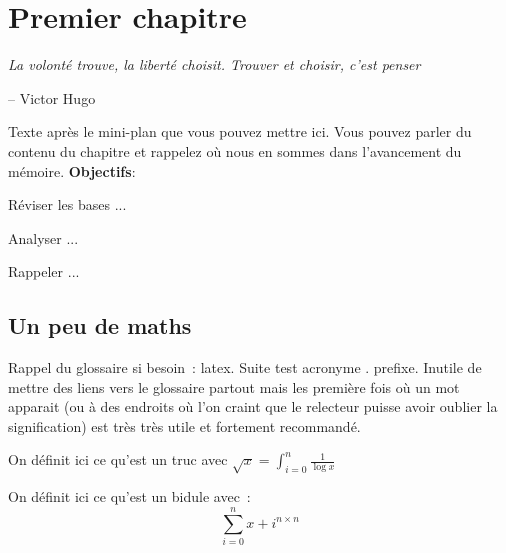 \chapter{Premier chapitre}
\label{chap:one}

\epigraph{\itshape  La volonté trouve, la liberté choisit. Trouver et choisir, c'est penser}{-- Victor Hugo}

\startcontents[chapters]

\printMyMinitoc

Texte après le mini-plan que vous pouvez mettre ici. Vous pouvez parler du contenu du chapitre et rappelez où nous en sommes dans l'avancement du mémoire.\newline
{\noindent \color{colorEPISEN-MEMOIRE}\textbf{Objectifs}}:
\begin{itemizeEPISEN}
	\item Réviser les bases ...
	\item Analyser ... 
	\item Rappeler ...
\end{itemizeEPISEN}

\fancyhead[LE]{\textsc{\chaptername~\thechapter}}


\section{Un peu de maths}
\label{sec:one:one}

Rappel du glossaire si besoin~: \gls{latex}. Suite test acronyme . \gls{prefixe}. Inutile de mettre des liens vers le glossaire partout mais les première fois où un mot apparait (ou à des endroits où l'on craint que le relecteur puisse avoir oublier la signification) est très très utile et fortement recommandé.

\lipsum[11] 

\begin{definition}[Un truc.]
On définit ici ce qu'est un truc avec $\sqrt{x}=\int_{i=0}^n \frac{1}{\log{x}}$
\end{definition}

\begin{definition}[Un bidule.]
On définit ici ce qu'est un bidule avec~:
\[
\sum_{i=0}^n x+i^{n \times n}
\]
\end{definition}

